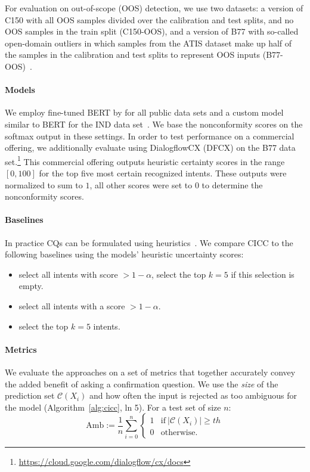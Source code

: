 \documentclass[11pt]{article}
\begin{document}
For evaluation on out-of-scope (OOS) detection, we use two datasets: a version of C150 with all OOS samples divided over the calibration and test splits, and no OOS samples in the train split (C150-OOS), and a version of B77 with so-called open-domain outliers in which samples from the ATIS dataset make up half of the samples in the calibration and test splits to represent OOS inputs (B77-OOS)~\cite{zhan2021out}.

\paragraph{Models} We employ fine-tuned BERT by \citet{kenton2019bert} for all public data sets and a custom model similar to BERT for the IND data set~\cite{alfieri2022intent}. We base the nonconformity scores on the softmax output in these settings. In order to test performance on a commercial offering, we additionally evaluate using DialogflowCX (DFCX) on the B77 data set.\footnote{\url{https://cloud.google.com/dialogflow/cx/docs}} This commercial offering outputs heuristic certainty scores in the range $ \left[0,100 \right]$ for the top five most certain recognized intents. These outputs were normalized to sum to $1$, all other scores were set to $0$ to determine the nonconformity scores.

\paragraph{Baselines}
In practice CQs can be formulated using heuristics~\cite{alfieri2022intent}. We compare CICC to the following baselines using the models' heuristic uncertainty scores:
\begin{itemize}
\item[B1] select all intents with score $>1-\alpha$, select the top $k=5$ if this selection is empty.
\item[B2] select all intents with a score $>1-\alpha$.
\item[B3] select the top $k=5$ intents.
\end{itemize}

\paragraph{Metrics}
We evaluate the approaches on a set of metrics that together accurately convey the added benefit of asking a confirmation question. We use the \emph{size} of the prediction set $\mathcal{C}(X_i)$ and how often the input is rejected as too ambiguous for the model (Algorithm~\ref{alg:cicc}, ln 5). For a test set of size $n$:
\begin{equation}
    \text{Amb} := \frac{1}{n} \sum_{i=0}^n
        \begin{cases}
            1 & \text{if}~|\mathcal{C}(X_i)| \geq th\\
            0 & \text{otherwise}.
        \end{cases}
\end{equation}
\end{document}
